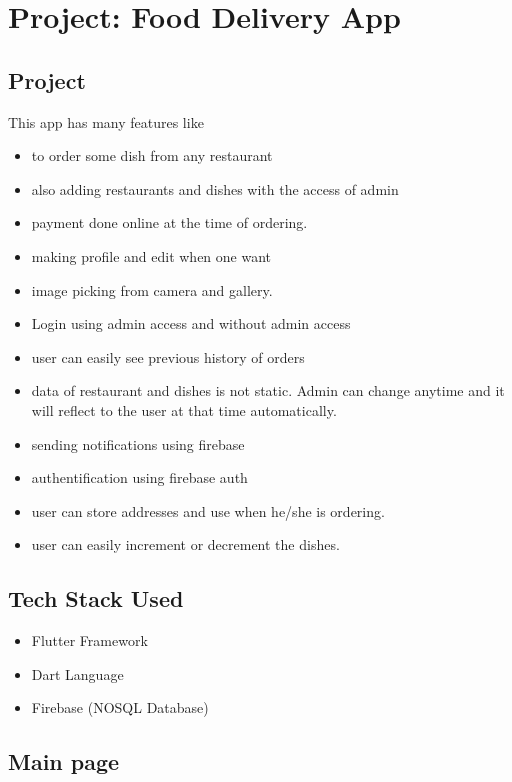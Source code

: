 \chapter{Project: Food Delivery App}

\section{Project}
This app has many features like 
\begin{itemize}
	\item to order some dish from any restaurant
	\item also adding restaurants and dishes with the access of admin
	\item payment done online at the time of ordering.
	\item making profile and edit when one want
	\item image picking from camera and gallery.
	\item Login using admin access and without admin access
	\item user can easily see previous history of orders
	\item data of restaurant and dishes is not static. Admin can change anytime and it will reflect to the user at that time automatically.
	\item sending notifications using firebase 
	\item authentification using firebase auth
	\item user can store addresses and use when he/she is ordering.
	\item user can easily increment or decrement the dishes.
	

\end{itemize}

\section{Tech Stack Used}
\begin{itemize}
	\item Flutter Framework
	\item Dart Language
	\item Firebase (NOSQL Database)
\end{itemize}
\section{Main page}

